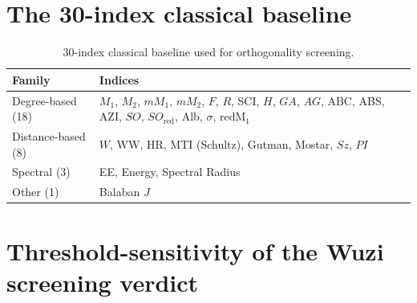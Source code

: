 \documentclass[11pt,a4paper]{article}
\begin{document}
\section{The 30-index classical baseline}

\begin{table}[h]
\centering
\caption{$30$-index classical baseline used for orthogonality screening.}
\label{tab:baseline}
\small
\begin{tabular}{ll}
\toprule
Family & Indices\\
\midrule
Degree-based (18) & $M_1$, $M_2$, $mM_1$, $mM_2$, $F$, $R$, SCI, $H$, $GA$, $AG$, ABC, ABS, AZI, $SO$, $SO_{\mathrm{red}}$, Alb, $\sigma$, $\mathrm{redM}_1$\\
Distance-based (8) & $W$, WW, HR, MTI (Schultz), Gutman, Mostar, $Sz$, $PI$\\
Spectral (3) & EE, Energy, Spectral Radius\\
Other (1) & Balaban $J$\\
\bottomrule
\end{tabular}
\end{table}

\section{Threshold-sensitivity of the Wuzi screening verdict}
\end{document}
